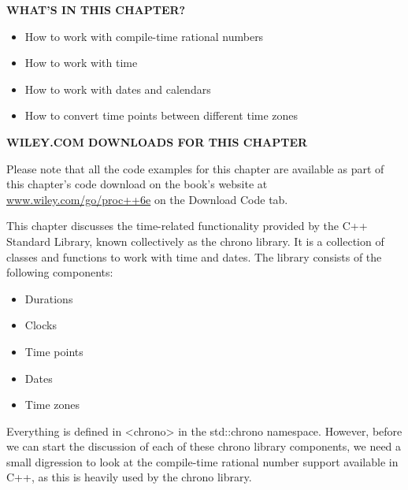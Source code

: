 \noindent
\textbf{WHAT’S IN THIS CHAPTER?}

\begin{itemize}
\item
How to work with compile-time rational numbers

\item
How to work with time

\item
How to work with dates and calendars

\item
How to convert time points between different time zones
\end{itemize}

\noindent
\textbf{WILEY.COM DOWNLOADS FOR THIS CHAPTER}

Please note that all the code examples for this chapter are available as part of this chapter’s code download on the book’s website at \url{www.wiley.com/go/proc++6e} on the Download Code tab.

This chapter discusses the time-related functionality provided by the C++ Standard Library, known collectively as the chrono library. It is a collection of classes and functions to work with time and dates. The library consists of the following components:

\begin{itemize}
\item
Durations

\item
Clocks

\item
Time points

\item
Dates

\item
Time zones
\end{itemize}

Everything is defined in <chrono> in the std::chrono namespace. However, before we can start the discussion of each of these chrono library components, we need a small digression to look at the compile-time rational number support available in C++, as this is heavily used by the chrono library.

